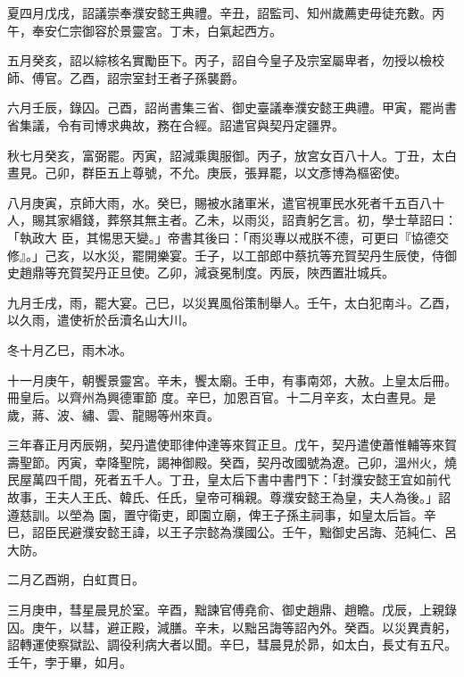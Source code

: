 \begin{pinyinscope}
 夏四月戊戌，詔議崇奉濮安懿王典禮。辛丑，詔監司、知州歲薦吏毋徒充數。丙午，奉安仁宗御容於景靈宮。丁未，白氣起西方。



 五月癸亥，詔以綜核名實勵臣下。丙子，詔自今皇子及宗室屬卑者，勿授以檢校師、傅官。乙酉，詔宗室封王者子孫襲爵。



 六月壬辰，錄囚。己酉，詔尚書集三省、御史臺議奉濮安懿王典禮。甲寅，罷尚書省集議，令有司博求典故，務在合經。詔遣官與契丹定疆界。



 秋七月癸亥，富弼罷。丙寅，詔減乘輿服御。丙子，放宮女百八十人。丁丑，太白晝見。己卯，群臣五上尊號，不允。庚辰，張昪罷，以文彥博為樞密使。



 八月庚寅，京師大雨，水。癸巳，賜被水諸軍米，遣官視軍民水死者千五百八十人，賜其家緡錢，葬祭其無主者。乙未，以雨災，詔責躬乞言。初，學士草詔曰：「執政大
 臣，其惕思天變。」帝書其後曰：「雨災專以戒朕不德，可更曰『協德交修』。」己亥，以水災，罷開樂宴。壬子，以工部郎中蔡抗等充賀契丹生辰使，侍御史趙鼎等充賀契丹正旦使。乙卯，減袞冕制度。丙辰，陜西置壯城兵。



 九月壬戌，雨，罷大宴。己巳，以災異風俗策制舉人。壬午，太白犯南斗。乙酉，以久雨，遣使祈於岳瀆名山大川。



 冬十月乙巳，雨木冰。



 十一月庚午，朝饗景靈宮。辛未，饗太廟。壬申，有事南郊，大赦。上皇太后冊。冊皇后。以齊州為興德軍節
 度。辛巳，加恩百官。十二月辛亥，太白晝見。是歲，蔣、波、繡、雲、龍賜等州來貢。



 三年春正月丙辰朔，契丹遣使耶律仲達等來賀正旦。戊午，契丹遣使蕭惟輔等來賀壽聖節。丙寅，幸降聖院，謁神御殿。癸酉，契丹改國號為遼。己卯，溫州火，燒民屋萬四千間，死者五千人。丁丑，皇太后下書中書門下：「封濮安懿王宜如前代故事，王夫人王氏、韓氏、任氏，皇帝可稱親。尊濮安懿王為皇，夫人為後。」詔遵慈訓。以塋為
 園，置守衛吏，即園立廟，俾王子孫主祠事，如皇太后旨。辛巳，詔臣民避濮安懿王諱，以王子宗懿為濮國公。壬午，黜御史呂誨、范純仁、呂大防。



 二月乙酉朔，白虹貫日。



 三月庚申，彗星晨見於室。辛酉，黜諫官傅堯俞、御史趙鼎、趙瞻。戊辰，上親錄囚。庚午，以彗，避正殿，減膳。辛未，以黜呂誨等詔內外。癸酉。以災異責躬，詔轉運使察獄訟、調役利病大者以聞。辛巳，彗晨見於昴，如太白，長丈有五尺。壬午，孛于畢，如月。




\end{pinyinscope}
